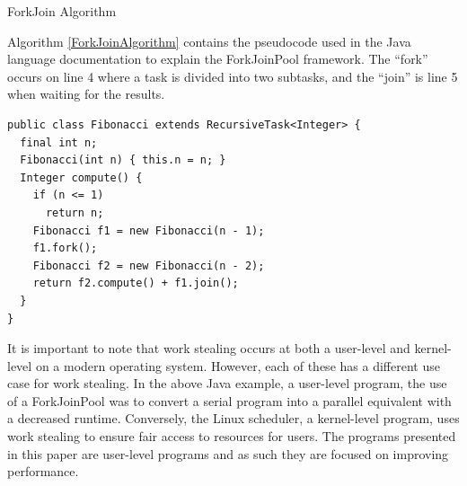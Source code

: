 \documentclass[12pt]{article}
\begin{document}
\IncMargin{1em}
\begin{algorithm}[H]
 \caption{ForkJoin Algorithm}
 \label{ForkJoinAlgorithm}
\end{algorithm}
\DecMargin{1em}
\medskip
Algorithm \ref{ForkJoinAlgorithm} contains the pseudocode used in the Java language documentation to explain the ForkJoinPool framework. The ``fork'' occurs on line 4 where a task is divided into two subtasks, and the ``join'' is line 5 when waiting for the results.

\newpage

\begin{lstlisting}[caption={An implementation of the Fibonacci algorithm using the ForkJoinFramework taken from the Java documentation},label=JavaRecursive]
public class Fibonacci extends RecursiveTask<Integer> {
  final int n;
  Fibonacci(int n) { this.n = n; }
  Integer compute() {
    if (n <= 1)
      return n;
    Fibonacci f1 = new Fibonacci(n - 1);
    f1.fork();
    Fibonacci f2 = new Fibonacci(n - 2);
    return f2.compute() + f1.join();
  }
}
\end{lstlisting}



It is important to note that work stealing occurs at both a user-level and kernel-level on a modern operating system. However, each of these has a different use case for work stealing. In the above Java example, a user-level program, the use of a ForkJoinPool was to convert a serial program into a parallel equivalent with a decreased runtime. Conversely, the Linux scheduler, a kernel-level program, uses work stealing to ensure fair access to resources for users. The programs presented in this paper are user-level programs and as such they are focused on improving performance.
\end{document}
